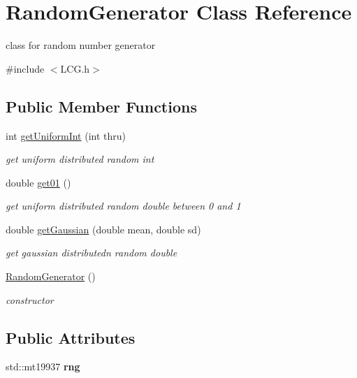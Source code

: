 \hypertarget{class_random_generator}{}\section{Random\+Generator Class Reference}
\label{class_random_generator}


class for random number generator  




{\ttfamily \#include $<$L\+C\+G.\+h$>$}

\subsection*{Public Member Functions}
\begin{DoxyCompactItemize}
\item 
int \mbox{\hyperlink{class_random_generator_a31e96453c7e88653190a31537f0402eb}{get\+Uniform\+Int}} (int thru)
\begin{DoxyCompactList}\small\item\em get uniform distributed random int \end{DoxyCompactList}\item 
double \mbox{\hyperlink{class_random_generator_a19c38cf91e2081794c3fba0c4e15292e}{get01}} ()
\begin{DoxyCompactList}\small\item\em get uniform distributed random double between 0 and 1 \end{DoxyCompactList}\item 
double \mbox{\hyperlink{class_random_generator_a3b3fb0a7f79a648b1dd8a9c52791408b}{get\+Gaussian}} (double mean, double sd)
\begin{DoxyCompactList}\small\item\em get gaussian distributedn random double \end{DoxyCompactList}\item 
\mbox{\label{class_random_generator_ad2b3256e634878160c7d8b6e865341b2}} 
\mbox{\hyperlink{class_random_generator_ad2b3256e634878160c7d8b6e865341b2}{Random\+Generator}} ()
\begin{DoxyCompactList}\small\item\em constructor \end{DoxyCompactList}\end{DoxyCompactItemize}
\subsection*{Public Attributes}
\begin{DoxyCompactItemize}
\item 
\mbox{\label{class_random_generator_a8f3daae6f71121a736c5d52d16027270}} 
std\+::mt19937 {\bfseries rng}
\end{DoxyCompactItemize}


